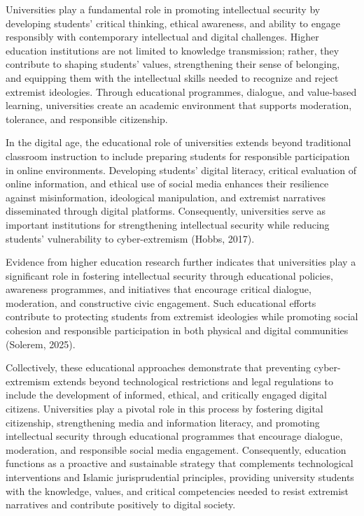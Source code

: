 \documentclass{NSP1}
\begin{document}
\par\medskip{}\smallskip

Universities play a fundamental role in promoting intellectual security by developing students' critical thinking, ethical awareness, and ability to engage responsibly with contemporary intellectual and digital challenges. Higher education institutions are not limited to knowledge transmission; rather, they contribute to shaping students' values, strengthening their sense of belonging, and equipping them with the intellectual skills needed to recognize and reject extremist ideologies. Through educational programmes, dialogue, and value-based learning, universities create an academic environment that supports moderation, tolerance, and responsible citizenship.

In the digital age, the educational role of universities extends beyond traditional classroom instruction to include preparing students for responsible participation in online environments. Developing students' digital literacy, critical evaluation of online information, and ethical use of social media enhances their resilience against misinformation, ideological manipulation, and extremist narratives disseminated through digital platforms. Consequently, universities serve as important institutions for strengthening intellectual security while reducing students' vulnerability to cyber-extremism (Hobbs, 2017).

Evidence from higher education research further indicates that universities play a significant role in fostering intellectual security through educational policies, awareness programmes, and initiatives that encourage critical dialogue, moderation, and constructive civic engagement. Such educational efforts contribute to protecting students from extremist ideologies while promoting social cohesion and responsible participation in both physical and digital communities (Solerem, 2025).

Collectively, these educational approaches demonstrate that preventing cyber-extremism extends beyond technological restrictions and legal regulations to include the development of informed, ethical, and critically engaged digital citizens. Universities play a pivotal role in this process by fostering digital citizenship, strengthening media and information literacy, and promoting intellectual security through educational programmes that encourage dialogue, moderation, and responsible social media engagement. Consequently, education functions as a proactive and sustainable strategy that complements technological interventions and Islamic jurisprudential principles, providing university students with the knowledge, values, and critical competencies needed to resist extremist narratives and contribute positively to digital society.
\end{document}
